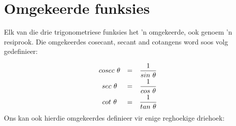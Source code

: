 % 
% 
% 
% 
% 
% 
% 
% 

\section{Omgekeerde funksies}
Elk van die drie trigonometriese funksies het 'n omgekeerde, ook genoem 'n resiprook. Die omgekeerdes cosecant, secant and cotangens word soos volg gedefinieer:

\begin{equation*}
\begin{array}{ccc}cosec~\theta & =& \dfrac{1}{sin~\theta } \vspace{3pt}\\
 sec~\theta & =& \dfrac{1}{cos~\theta } \vspace{3pt}\\
 cot~\theta & =& \dfrac{1}{tan~\theta }
\end{array}
\end{equation*}
Ons kan ook hierdie omgekeerdes definieer vir enige reghoekige driehoek:

